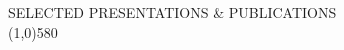 \documentclass{article}
\begin{document}
\begin{small}
\end{small}

\noindent \large{SELECTED PRESENTATIONS \& PUBLICATIONS}\\ 
\line(1,0){580}\\
\end{document}
